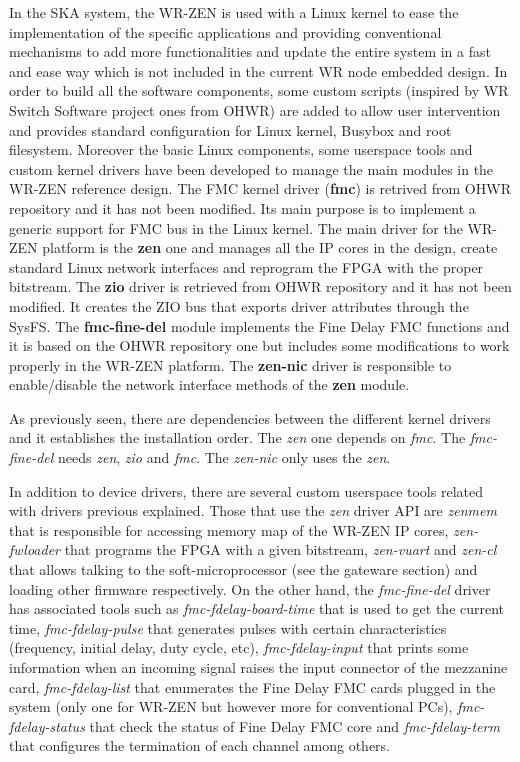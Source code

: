 In the SKA system, the WR-ZEN is used with a Linux 
kernel to ease the implementation of the specific applications and providing 
conventional mechanisms to add more functionalities and update the entire 
system in a fast and ease way which is not included in the current WR node 
embedded design. In order to build all the software components, some custom 
scripts (inspired by WR Switch Software project ones from OHWR) are added to 
allow user intervention and provides standard configuration for Linux kernel, 
Busybox and root filesystem.  
Moreover the basic Linux components, some userspace tools and custom kernel 
drivers have been developed to manage the main modules in the WR-ZEN reference 
design. The FMC kernel driver (\textbf{fmc}) is retrived from OHWR repository and it has not
been modified. Its main purpose is to implement a generic support for FMC bus
in the Linux kernel. The main driver for the WR-ZEN platform is the \textbf{zen} one
and manages all the IP cores in the design, create standard Linux network interfaces and
reprogram the FPGA with the proper bitstream. The \textbf{zio} driver is 
retrieved from OHWR
repository and it has not been modified. It creates the ZIO bus that exports driver attributes
through the SysFS. The \textbf{fmc-fine-del} module implements the Fine Delay FMC functions and
it is based on the OHWR repository one but includes some modifications to work properly in the
WR-ZEN platform. The \textbf{zen-nic} driver is responsible to enable/disable the network 
interface methods of the \textbf{zen} module.

As previously seen, there are dependencies between the different kernel drivers and it establishes the installation order. The \textit{zen} one depends on \textit{fmc}. The \textit{fmc-fine-del} needs \textit{zen}, \textit{zio} and \textit{fmc}. The \textit{zen-nic} only uses the \textit{zen}.

In addition to device drivers, there are several custom userspace tools related with drivers previous explained. Those that use the \textit{zen} driver API are \textit{zenmem} that is responsible for accessing memory map of the WR-ZEN IP cores, \textit{zen-fwloader} that programs the FPGA with a given bitstream, \textit{zen-vuart} and \textit{zen-cl} that allows talking to the soft-microprocessor (see the gateware section) and loading other firmware respectively. On the other hand, the  \textit{fmc-fine-del} driver has associated tools such as \textit{fmc-fdelay-board-time} that is used to get the current time, \textit{fmc-fdelay-pulse} that generates pulses with certain characteristics (frequency, initial delay, duty cycle, etc), \textit{fmc-fdelay-input} that prints some information when an incoming signal raises the input connector of the mezzanine card, \textit{fmc-fdelay-list} that enumerates the Fine Delay FMC cards plugged in the system (only one for WR-ZEN but however more for conventional PCs), \textit{fmc-fdelay-status} that check the status of Fine Delay FMC core and \textit{fmc-fdelay-term} that configures the termination of each channel among others.

